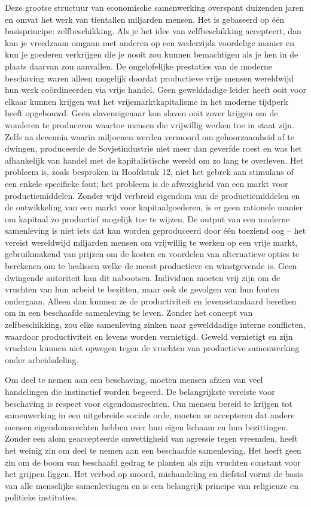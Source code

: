 Deze grootse structuur van economische samenwerking overspant duizenden jaren en omvat het werk van tientallen miljarden mensen. Het is gebaseerd op één basisprincipe: zelfbeschikking. Als je het idee van zelfbeschikking accepteert, dan kan je vreedzaam omgaan met anderen op een wederzijds voordelige manier en kun je goederen verkrijgen die je nooit zou kunnen bemachtigen als je hen in de plaats daarvan zou aanvallen. De ongelofelijke prestaties van de moderne beschaving waren alleen mogelijk doordat productieve vrije mensen wereldwijd hun werk coördineerden via vrije handel. Geen gewelddadige leider heeft ooit voor elkaar kunnen krijgen wat het vrijemarktkapitalisme in het moderne tijdperk heeft opgebouwd. Geen slaveneigenaar kon slaven ooit zover krijgen om de wonderen te produceren waartoe mensen die vrijwillig werken toe in staat zijn. Zelfs na decennia waarin miljoenen werden vermoord om gehoorzaamheid af te dwingen, produceerde de Sovjetindustrie niet meer dan geverfde roest en was het afhankelijk van handel met de kapitalistische wereld om zo lang te overleven. Het probleem is, zoals besproken in Hoofdstuk 12, niet het gebrek aan stimulans of een enkele specifieke fout; het probleem is de afwezigheid van een markt voor productiemiddelen. Zonder wijd verbreid eigendom van de productiemiddelen en de ontwikkeling van een markt voor kapitaalgoederen, is er geen rationele manier om kapitaal zo productief mogelijk toe te wijzen. De output van een moderne samenleving is niet iets dat kan worden geproduceerd door één toeziend oog -- het vereist wereldwijd miljarden mensen om vrijwillig te werken op een vrije markt, gebruikmakend van prijzen om de kosten en voordelen van alternatieve opties te berekenen om te beslissen welke de meest productieve en winstgevende is. Geen dwingende autoriteit kan dit nabootsen. Individuen moeten vrij zijn om de vruchten van hun arbeid te bezitten, maar ook de gevolgen van hun fouten ondergaan. Alleen dan kunnen ze de productiviteit en levensstandaard bereiken om in een beschaafde samenleving te leven. Zonder het concept van zelfbeschikking, zou elke samenleving zinken naar gewelddadige interne conflicten, waardoor productiviteit en levens worden vernietigd. Geweld vernietigt en zijn vruchten kunnen niet opwegen tegen de vruchten van productieve samenwerking onder arbeidsdeling.

Om deel te nemen aan een beschaving, moeten mensen afzien van veel handelingen die instinctief worden begeerd. De belangrijkste vereiste voor beschaving is respect voor eigendomsrechten. Om mensen bereid te krijgen tot samenwerking in een uitgebreide sociale orde, moeten ze accepteren dat andere mensen eigendomsrechten hebben over hun eigen lichaam en hun bezittingen. Zonder een alom geaccepteerde onwettigheid van agressie tegen vreemden, heeft het weinig zin om deel te nemen aan een beschaafde samenleving. Het heeft geen zin om de boom van beschaafd gedrag te planten als zijn vruchten constant voor het grijpen liggen. Het verbod op moord, mishandeling en diefstal vormt de basis van alle menselijke samenlevingen en is een belangrijk principe van religieuze en politieke instituties.

